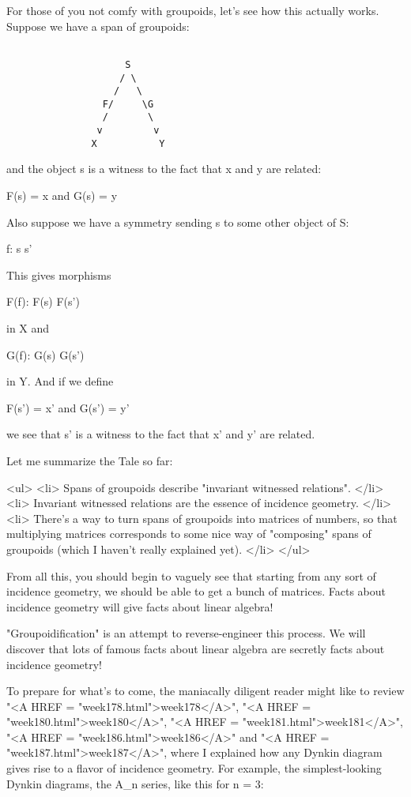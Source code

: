 For those of you not comfy with groupoids, let's see how this actually
works.  Suppose we have a span of groupoids:


\begin{verbatim}

                     S
                    / \
                   /   \
                 F/     \G
                 /       \
                v         v 
               X           Y
\end{verbatim}
    
and the object s is a witness to the fact that x and y are related:

F(s) = x and G(s) = y

Also suppose we have a symmetry sending s to some other object of S:

f: s \to  s'

This gives morphisms 

F(f): F(s) \to  F(s')

in X and 

G(f): G(s) \to  G(s')

in Y.  And if we define

F(s') = x' and G(s') = y'

we see that s' is a witness to the fact that x' and y' are related.

Let me summarize the Tale so far: 

<ul>
<li>  Spans of groupoids describe "invariant witnessed relations".
</li>
<li>
  Invariant witnessed relations are the essence of incidence geometry.
</li>
<li>
  There's a way to turn spans of groupoids into matrices of numbers,
  so that multiplying matrices corresponds to some nice way of 
  "composing" spans of groupoids (which I haven't really explained yet).
</li>
</ul>

From all this, you should begin to vaguely see that starting from any sort 
of incidence geometry, we should be able to get a bunch of matrices.
Facts about incidence geometry will give facts about linear algebra!

"Groupoidification" is an attempt to reverse-engineer this process.
We will discover that lots of famous facts about linear algebra are
secretly facts about incidence geometry!

To prepare for what's to come, the maniacally diligent reader might
like to review "<A HREF = "week178.html">week178</A>", "<A HREF = "week180.html">week180</A>", "<A HREF = "week181.html">week181</A>", "<A HREF = "week186.html">week186</A>" and "<A HREF = "week187.html">week187</A>",
where I explained how any Dynkin diagram gives rise to a flavor
of incidence geometry.  For example, the simplest-looking Dynkin
diagrams, the A_{n} series, like this for n = 3:
 

